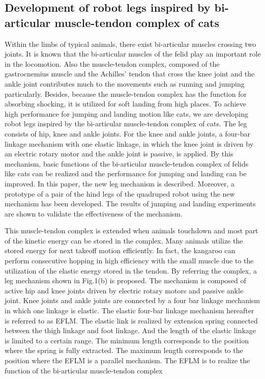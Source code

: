 \documentclass{romjist}
\begin{document}
\subsection{Development of robot legs inspired by bi-articular muscle-tendon complex of cats}
\cite{4}Within the limbs of typical animals, there exist bi-articular muscles crossing two joints. It is known that the bi-articular muscles of the felid play an important role in the locomotion. Also the muscle-tendon complex, composed of the gastrocnemius muscle and the Achilles’ tendon that cross the knee joint and the ankle joint contributes much to the movements such as running and jumping particularly. Besides, because the muscle-tendon complex has the function for absorbing shocking, it is utilized for soft landing from high places. To achieve high performance for jumping and landing motion like cats, we are developing robot legs inspired by the bi-articular muscle-tendon complex of cats. The leg consists of hip, knee and ankle joints. For the knee and ankle joints, a four-bar linkage mechanism with one elastic linkage, in which the knee joint is driven by an electric rotary motor and the ankle joint is passive, is applied. By this mechanism, basic functions of the bi-articular muscle-tendon complex of felids like cats can be realized and the performance for jumping and landing can be improved. In this paper, the new leg mechanism is described. Moreover, a prototype of a pair of the hind legs of the quadruped robot using the new mechanism has been developed. The results of jumping and landing experiments are shown to validate the effectiveness of the mechanism.\par
This muscle-tendon complex is extended when animals touchdown and most part of the kinetic energy can be stored in the complex. Many animals utilize the stored energy for next takeoff motion efficiently. In fact, the kangaroo can perform consecutive hopping in high efficiency with the small muscle due to the utilization of the elastic energy stored in the tendon. By referring the complex, a leg mechanism shown in Fig.1(b) is proposed. The mechanism is composed of active hip and knee joints driven by electric rotary motors and passive ankle joint. Knee joints and ankle joints are connected by a four bar linkage mechanism in which one linkage is elastic. The elastic four-bar linkage mechanism hereafter is referred to as EFLM. The elastic link is realized by extension spring connected between the thigh linkage and foot linkage. And the length of the elastic linkage is limited to a certain range. The minimum length corresponds to the position where the spring is fully extracted. The maximum length corresponds to the position where the EFLM is a parallel mechanism. The EFLM is to realize the function of the bi-articular muscle-tendon complex
\end{document}
